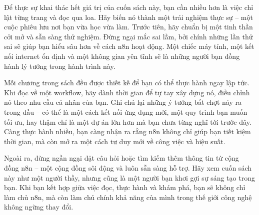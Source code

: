 \documentclass[a4paper,12pt,oneside]{book}
\begin{document}
\begin{center}
\end{center}

Để thực sự khai thác hết giá trị của cuốn sách này, bạn cần nhiều hơn là việc chỉ lật từng trang và đọc qua loa. Hãy biến nó thành một trải nghiệm thực sự – một cuộc phiêu lưu nơi bạn vừa học vừa làm. Trước tiên, hãy chuẩn bị một tinh thần cởi mở và sẵn sàng thử nghiệm. Đừng ngại mắc sai lầm, bởi chính những lần thử sai sẽ giúp bạn hiểu sâu hơn về cách n8n hoạt động. Một chiếc máy tính, một kết nối internet ổn định và một không gian yên tĩnh sẽ là những người bạn đồng hành lý tưởng trong hành trình này.

Mỗi chương trong sách đều được thiết kế để bạn có thể thực hành ngay lập tức. Khi đọc về một workflow, hãy dành thời gian để tự tay xây dựng nó, điều chỉnh nó theo nhu cầu cá nhân của bạn. Ghi chú lại những ý tưởng bất chợt nảy ra trong đầu – có thể là một cách kết nối ứng dụng mới, một quy trình bạn muốn tối ưu, hay thậm chí là một dự án lớn hơn mà bạn chưa từng nghĩ tới trước đây. Càng thực hành nhiều, bạn càng nhận ra rằng n8n không chỉ giúp bạn tiết kiệm thời gian, mà còn mở ra một cách tư duy mới về công việc và hiệu suất.

Ngoài ra, đừng ngần ngại đặt câu hỏi hoặc tìm kiếm thêm thông tin từ cộng đồng n8n – một cộng đồng sôi động và luôn sẵn sàng hỗ trợ. Hãy xem cuốn sách này như một người thầy, nhưng cũng là một người bạn khơi gợi sự sáng tạo trong bạn. Khi bạn kết hợp giữa việc đọc, thực hành và khám phá, bạn sẽ không chỉ làm chủ n8n, mà còn làm chủ chính khả năng của mình trong thế giới công nghệ không ngừng thay đổi.
\end{document}

